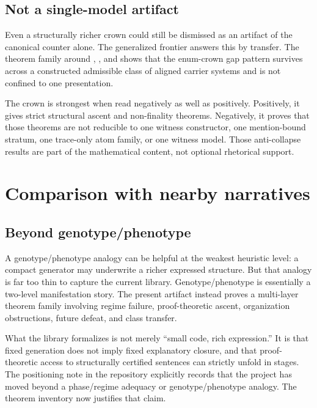 \documentclass[11pt,a4paper]{article}
\newenvironment{keybox}[1]{%
  \Needspace*{8\baselineskip}%
  \begin{tcolorbox}[
    enhanced, breakable=false,
    colback=blue!5, colframe=blue!45!black, coltitle=black,
    colbacktitle=blue!14, boxrule=0.85pt, arc=2.5pt,
    left=9pt, right=9pt, top=6pt, bottom=6pt,
    titlerule=0.55pt, fonttitle=\bfseries, title={#1},
    before upper=\raggedright,
    before skip=0.9\baselineskip, after skip=0.9\baselineskip
  ]%
}{%
  \end{tcolorbox}%
}
\theoremstyle{definition}
\begin{document}
\subsection{Not a single-model artifact}

Even a structurally richer crown could still be dismissed as an artifact of the canonical counter alone. The generalized frontier answers this by transfer. The theorem family around , , and  shows that the enum-crown gap pattern survives across a constructed admissible class of aligned carrier systems and is not confined to one presentation.

\begin{keybox}{What anti-collapse accomplishes}
The crown is strongest when read negatively as well as positively. Positively, it gives strict structural ascent and non-finality theorems. Negatively, it proves that those theorems are not reducible to one witness constructor, one mention-bound stratum, one trace-only atom family, or one witness model. Those anti-collapse results are part of the mathematical content, not optional rhetorical support.
\end{keybox}

\section{Comparison with nearby narratives}\label{sec:comparison}

\subsection{Beyond genotype/phenotype}

A genotype/phenotype analogy can be helpful at the weakest heuristic level: a compact generator may underwrite a richer expressed structure. But that analogy is far too thin to capture the current library. Genotype/phenotype is essentially a two-level manifestation story. The present artifact instead proves a multi-layer theorem family involving regime failure, proof-theoretic ascent, organization obstructions, future defeat, and class transfer.

What the library formalizes is not merely ``small code, rich expression.'' It is that fixed generation does not imply fixed explanatory closure, and that proof-theoretic access to structurally certified sentences can strictly unfold in stages. The positioning note in the repository explicitly records that the project has moved beyond a phase/regime adequacy or genotype/phenotype analogy. The theorem inventory now justifies that claim.
\end{document}
